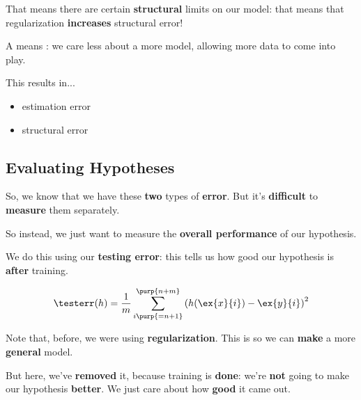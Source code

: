         That means there are certain \textbf{structural} limits on our model: that means that regularization \textbf{increases} structural error!\\
        
        \begin{concept}
            A  means : we care less about a more  model, allowing more  data to come into play.
            
            This results in...
            
            \begin{itemize}
                \item {} estimation error
                \item  {} structural error
            \end{itemize}
        \end{concept}
        
    \subsection{Evaluating Hypotheses}
    
        So, we know that we have these \textbf{two} types of \textbf{error}. But it's \textbf{difficult} to \textbf{measure} them separately. 
        
        So instead, we just want to measure the \textbf{overall performance} of our hypothesis. 
        
        We do this using our \textbf{testing error}: this tells us how good our hypothesis is \textbf{after} training.
        
        \begin{equation}
            \testerr(h) =
            \frac{1}{m}  
            \sum_{i\purp{=n+1}}^{\purp{n+m}} 
                \left( 
                    h(\ex{x}{i}) - \ex{y}{i} 
                \right)^2
        \end{equation}
        
        Note that, before, we were using \textbf{regularization}. This is so we can \textbf{make} a more \textbf{general} model. 
        
        But here, we've \textbf{removed} it, because training is \textbf{done}: we're \textbf{not} going to make our hypothesis \textbf{better}. We just care about how \textbf{good} it came out.
        \\
        

